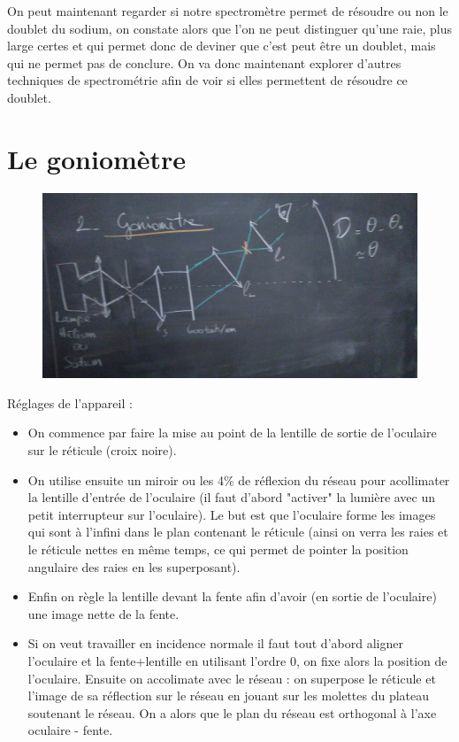 \documentclass[12pt,prb,aps,epsf]{report}
\begin{document}
On peut maintenant regarder si notre spectromètre permet de résoudre ou non le doublet du sodium, on constate alors que l'on ne peut distinguer qu'une raie, plus large certes et qui permet donc de deviner que c'est peut être un doublet, mais qui ne permet pas de conclure. On va donc maintenant explorer d'autres techniques de spectrométrie afin de voir si elles permettent de résoudre ce doublet.

\section{Le goniomètre}

\begin{figure}
	\centerline{\includegraphics[width=12cm]{gonio}}
\end{figure}

Réglages de l'appareil :
\begin{itemize}
	\item On commence par faire la mise au point de la lentille de sortie de l'oculaire sur le réticule (croix noire). 
	\item On utilise ensuite un miroir ou les 4\% de réflexion du réseau pour acollimater la lentille d'entrée de l'oculaire (il faut d'abord "activer" la lumière avec un petit interrupteur sur l'oculaire). Le but est que l'oculaire forme les images qui sont à l'infini dans le plan contenant le réticule (ainsi on verra les raies et le réticule nettes en même temps, ce qui permet de pointer la position angulaire des raies en les superposant).
	\item Enfin on règle la lentille devant la fente afin d'avoir (en sortie de l'oculaire) une image nette de la fente.
	\item Si on veut travailler en incidence normale il faut tout d'abord aligner l'oculaire et la fente+lentille en utilisant l'ordre 0, on fixe alors la position de l'oculaire. Ensuite on accolimate avec le réseau : on superpose le réticule et l'image de sa réflection sur le réseau en jouant sur les molettes du plateau soutenant le réseau. On a alors que le plan du réseau est orthogonal à l'axe oculaire - fente.
\end{itemize}
\end{document}

